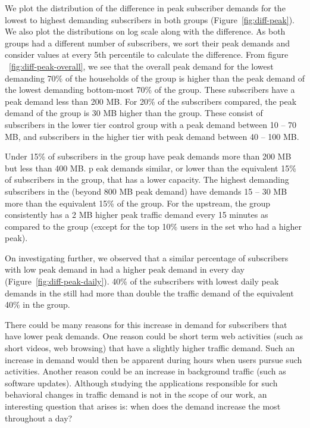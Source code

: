 We plot the distribution of the difference in peak subscriber demands for
the lowest to highest demanding subscribers in both groups (Figure~\ref{fig:diff-peak}).
We also plot the distributions on log scale along with the difference.
As both groups had a different number of subscribers, we sort their peak demands
and consider values at every 5th percentile to calculate the difference.
From figure ~\ref{fig:diff-peak-overall}, we see that the overall peak demand for the
lowest demanding 70\% of the households of the \treatment{} group is higher than
the peak demand of the lowest demanding bottom-most
70\% of the \control{} group. These subscribers have a peak demand less than 200 MB.
For 20\% of the subscribers compared, the peak demand of the \treatment group is 30 MB
higher than the \control group. These consist of subscribers in the lower tier
control group with a peak demand between 10 -- 70 MB, and subscribers in the higher
tier with peak demand between 40 -- 100 MB.

Under 15\% of subscribers in the \treatment{} group have peak demands more than 200 MB
but less than 400 MB. p
eak demands similar, or lower than the equivalent 15\% of subscribers in the \control{}
group, that has a lower capacity. The highest demanding subscribers in the \treatment{}
(beyond 800 MB peak demand) have demands 15 -- 30 MB more than the equivalent 15\% of 
the \control{} group. For the upstream, the \treatment{} group consistently has
a 2 MB higher peak traffic demand every 15 minutes as compared to the \control{} group
(except for the top 10\% users in the \treatment{} set who had a higher peak).


On investigating further, we observed that a similar percentage of 
subscribers with low peak demand in \control{} had a higher peak demand in \treatment{} every
day (Figure~\ref{fig:diff-peak-daily}).
40\% of the subscribers with lowest daily peak demands in the \treatment{} still
had more than double the traffic demand of the equivalent 40\% in the \control{} group.

There could be many reasons for this increase in demand for subscribers that
have lower peak demands. One reason could be short term web activities (such as short videos,
web browsing) that have a slightly higher traffic demand. Such an increase in demand would then
be apparent during hours when users pursue such activities. Another reason could be
an increase in background traffic (such as software updates). Although studying the applications 
responsible for such behavioral changes in traffic demand is not in the scope of our
work, an interesting question that arises is: when does the demand increase the most 
throughout a day?